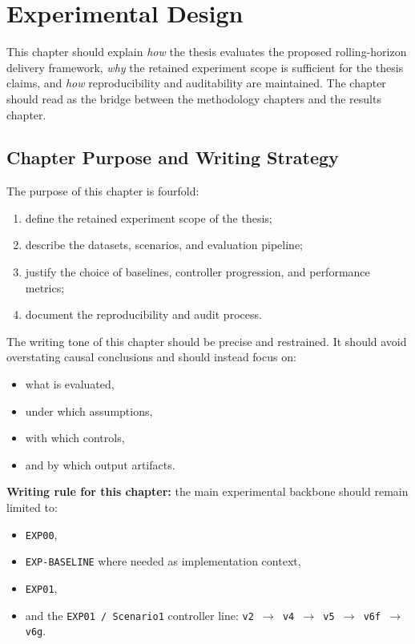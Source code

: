 \chapter{Experimental Design}
\label{chap:experimental_design}

This chapter should explain \emph{how} the thesis evaluates the proposed rolling-horizon delivery framework, \emph{why} the retained experiment scope is sufficient for the thesis claims, and \emph{how} reproducibility and auditability are maintained. The chapter should read as the bridge between the methodology chapters and the results chapter.

\section{Chapter Purpose and Writing Strategy}

The purpose of this chapter is fourfold:
\begin{enumerate}
    \item define the retained experiment scope of the thesis;
    \item describe the datasets, scenarios, and evaluation pipeline;
    \item justify the choice of baselines, controller progression, and performance metrics;
    \item document the reproducibility and audit process.
\end{enumerate}

The writing tone of this chapter should be precise and restrained. It should avoid overstating causal conclusions and should instead focus on:
\begin{itemize}
    \item what is evaluated,
    \item under which assumptions,
    \item with which controls,
    \item and by which output artifacts.
\end{itemize}

\noindent\textbf{Writing rule for this chapter:}
the main experimental backbone should remain limited to:
\begin{itemize}
    \item \texttt{EXP00},
    \item \texttt{EXP-BASELINE} where needed as implementation context,
    \item \texttt{EXP01},
    \item and the \texttt{EXP01 / Scenario1} controller line:
    \texttt{v2 $\rightarrow$ v4 $\rightarrow$ v5 $\rightarrow$ v6f $\rightarrow$ v6g}.
\end{itemize}

